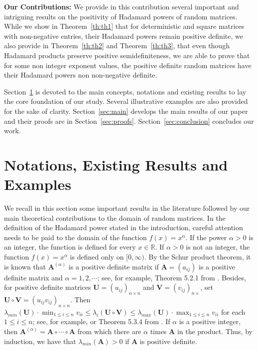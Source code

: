 \documentclass[conference,letterpaper]{IEEEtran}
\numberwithin{equation}{section}
\newcommand{\lbl}{\label}
\begin{document}

\textbf{Our Contributions: }
We provide in this contribution several important and intriguing results on the positivity of Hadamard powers of random matrices. 
While we show in Theorem~\ref{th:th1} that for deterministic and square matrices with non-negative entries, their Hadamard powers remain positive definite, we also provide in Theorem~\ref{th:th2} and Theorem~\ref{th:th3}, that even though Hadamard products preserve positive semidefiniteness, we are able to prove that for some non integer exponent values, the positive definite random matrices have their Hadamard powers non non-negative definite.


Section~\ref{sec:notations} is devoted to the main concepts, notations and existing results to lay the core foundation of our study.
Several illustrative examples are also provided for the sake of clarity.
Section~\ref{sec:main} develops the main results of our paper and their proofs are in Section~\ref{sec:proofs}.
Section~\ref{sec:conclusion} concludes our work.

\section{Notations, Existing Results and Examples}\lbl{sec:notations}
We recall in this section some important results in the literature followed by our main theoretical contributions to the domain of random matrices.
In the definition of the Hadamard power stated in the introduction, careful attention needs to be paid to the domain of the function $f(x)=x^{\alpha}$. 
If the power $\alpha>0$ is an integer, the function is defined for every $x\in \mathbb{R}.$ If $\alpha>0$ is not an integer, the function $f(x)=x^{\alpha}$ is defined only on $[0, \infty).$ By the Schur product theorem, it is known that $\mathbf{A}^{(\alpha)}$ is a positive definite matrix if $\mathbf{A}=(a_{ij})$ is a positive definite matrix and $\alpha =1,2, \cdots$; see, for example, Theorem 5.2.1 from \cite{horn_johnson_1991}. 
Besides, for positive definite matrices $\mathbf{U}=(u_{ij})_{n\times n}$ and $\mathbf{V}=(v_{ij})_{n\times}$, set $\mathbf{U}\circ \mathbf{V}=(u_{ij}v_{ij})_{n\times n}$. 
Then  $\lambda_{min}(\mathbf{U})\cdot\min_{1\leq i \leq n}{v_{ii}}\leq \lambda_i(\mathbf{U}\circ \mathbf{V})\leq \lambda_{max}(\mathbf{U})\cdot\max_{1\leq i \leq n}{v_{ii}}$ for each $1\leq i \leq n$; see, for example, \cite{schur1911bemerkungen} or Theorem 5.3.4 from \cite{horn_johnson_1991}. 
If $\alpha$ is a positive integer, then  $\mathbf{A}^{(\alpha)}=\mathbf{A}\circ\cdots\circ\mathbf{A}$ from which there are $\alpha$ times $\mathbf{A}$ in the product. Thus, by induction, we have that $\lambda_{min}(\mathbf{A})>0$ if $\mathbf{A}$ is positive definite.
\end{document}
